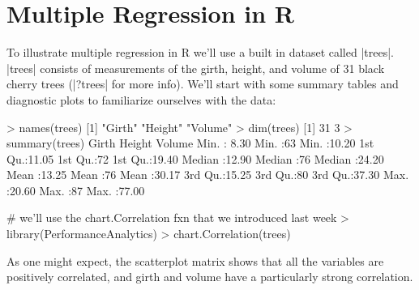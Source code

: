 

\section{Multiple Regression in R}

To illustrate multiple regression in R we'll use a built in dataset called |trees|. |trees| consists of measurements of the girth, height, and volume of 31 black cherry trees (|?trees| for more info). We'll start with some summary tables and diagnostic plots to familiarize ourselves with the data:
%
\begin{R}
> names(trees)
[1] "Girth"  "Height" "Volume"
> dim(trees)
[1] 31  3
> summary(trees)
     Girth           Height       Volume
 Min.   : 8.30   Min.   :63   Min.   :10.20
 1st Qu.:11.05   1st Qu.:72   1st Qu.:19.40
 Median :12.90   Median :76   Median :24.20
 Mean   :13.25   Mean   :76   Mean   :30.17
 3rd Qu.:15.25   3rd Qu.:80   3rd Qu.:37.30
 Max.   :20.60   Max.   :87   Max.   :77.00

# we'll use the chart.Correlation fxn that we introduced last week 
> library(PerformanceAnalytics)  
> chart.Correlation(trees)
\end{R}
%
As one might expect, the scatterplot matrix shows that all the variables are positively correlated, and girth and volume have a  particularly strong correlation.

